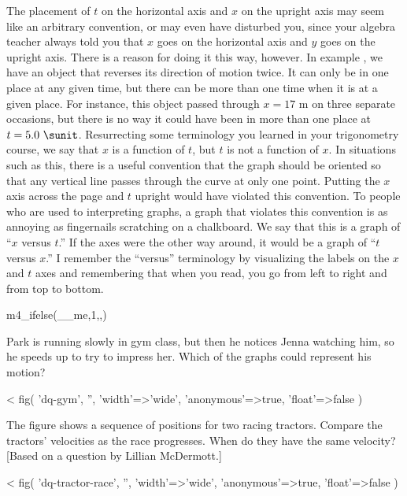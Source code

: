 The placement of $t$ on the horizontal axis and $x$ on the
upright axis may seem like an arbitrary convention, or may
even have disturbed you, since your algebra teacher always
told you that $x$ goes on the horizontal axis and $y$ goes
on the upright axis.  There is a reason for doing it this
way, however.  In example , we have an object that
reverses its direction of motion twice.  It can only be in
one place at any given time, but there can be more than one
time when it is at a given place.  For instance, this object
passed through $x=17$ m on three separate occasions, but
there is no way it could have been in more than one place at
$t=5.0\ \sunit$.  Resurrecting some terminology you learned in
your trigonometry course, we say that $x$ is a function of
$t$, but $t$ is not a function of $x$.  In situations such
as this, there is a useful convention that the graph should
be oriented so that any vertical line passes through the
curve at only one point.  Putting the $x$ axis across the
page and $t$ upright would have violated this convention.
To people who are used to interpreting graphs, a graph that
violates this convention is as annoying as fingernails
scratching on a chalkboard.  We say that this is a graph of
``$x$ versus $t$.''  If the axes were the other way around,
it would be a graph of ``$t$ versus $x$.''   I remember the
``versus'' terminology by visualizing the labels on the $x$
and $t$ axes and remembering that when you read, you go from
left to right and from top to bottom.

m4_ifelse(__me,1,,\vfill)

\startdqs

\begin{dq}
Park is running slowly in gym class, but then he notices Jenna
watching him, so he speeds up to try to impress her. Which
of the graphs could represent his motion?
\end{dq}

<%
  fig(
    'dq-gym',
    '',
    {
      'width'=>'wide',
      'anonymous'=>true,
      'float'=>false
    }
  )

\pagebreak

\begin{dq}
The figure shows a sequence of positions for two racing
tractors. Compare the tractors' velocities as the race
progresses. When do they have the same velocity? [Based on
a question by Lillian McDermott.]
\end{dq}

<%
  fig(
    'dq-tractor-race',
    '',
    {
      'width'=>'wide',
      'anonymous'=>true,
      'float'=>false
    }
  )

